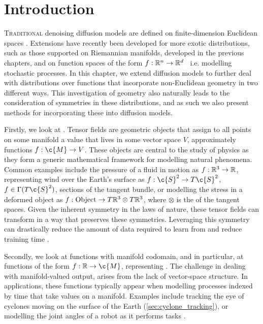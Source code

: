 
\section{Introduction}
\label{sec:intro}

\lettrine{T}{raditional} denoising diffusion models are defined on finite-dimension Euclidean spaces \parencite{song2019generative,song2020score,ho2020denoising,nichol2021beatgans}.
Extensions have recently been developed for more exotic distributions, such as those supported on Riemannian manifolds, developed in the previous chapters, and on function spaces of the form \(f:\mathbb{R}^n\to\mathbb{R}^d\)~\parencite{dutordoir2022Neural,kerrigan2022Diffusion,lim2023scorefunction,pidstrigach2023InfiniteDimensional,franzese2023continuous,bond2023infty} i.e. modelling stochastic processes.
In this chapter, we extend diffusion models to further deal with distributions over functions that incorporate non-Euclidean geometry in two different ways.
This investigation of geometry also naturally leads to the consideration of symmetries in these distributions, and as such we also present methods for incorporating these into diffusion models.

Firstly, we look at .
Tensor fields are geometric objects that assign to all points on some manifold a value that lives in some vector space \(V\), approximately functions \(f:\c{M}\to V\).
These objects are central to the study of physics as they form a generic mathematical framework for modelling natural phenomena.
Common examples include the pressure of a fluid in motion as \(f: \mathbb{R}^3 \to \mathbb{R}\), representing wind over the Earth's surface as \(f: \c{S}^2 \to T\c{S}^2\), \(f\in \Gamma(T\c{S}^2)\), sections of the tangent bundle, or modelling the stress in a deformed object as \(f: \text{Object} \to T\mathbb{R}^3 \otimes T\mathbb{R}^3\), where \(\otimes\) is the  of the tangent spaces.
Given the inherent symmetry in the laws of nature, these tensor fields can transform in a way that preserves these symmetries.
Leveraging this symmetry can drastically reduce the amount of data required to learn from and reduce training time \cite{elesedy2021provably,elesedy2021provably2,lyle2020benefits,NEURIPS2022_257b9a6a}.


Secondly, we look at functions with manifold codomain, and in particular, at functions of the form \(f: \R \to \c{M}\), representing .
The challenge in dealing with manifold-valued output, arises from the lack of vector-space structure.
In applications, these functions typically appear when modelling processes indexed by time that take values on a manifold.
Examples include tracking the eye of cyclones moving on the surface of the Earth (\cref{sec:cyclone_tracking}), or modelling the joint angles of a robot as it performs tasks \cite{jaquier2021geometry}.

